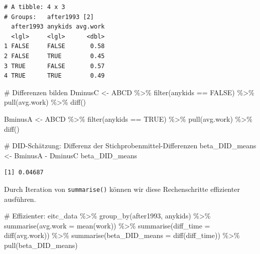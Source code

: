 \documentclass[
  a4paper,
  DIV=11,
  oneside]{scrreprt}
\newenvironment{Shaded}{\begin{snugshade}}{\end{snugshade}}
\newcommand{\AttributeTok}[1]{\textcolor[rgb]{0.40,0.45,0.13}{#1}}
\newcommand{\CommentTok}[1]{\textcolor[rgb]{0.37,0.37,0.37}{#1}}
\newcommand{\ConstantTok}[1]{\textcolor[rgb]{0.56,0.35,0.01}{#1}}
\newcommand{\FunctionTok}[1]{\textcolor[rgb]{0.28,0.35,0.67}{#1}}
\newcommand{\NormalTok}[1]{\textcolor[rgb]{0.00,0.23,0.31}{#1}}
\newcommand{\OtherTok}[1]{\textcolor[rgb]{0.00,0.23,0.31}{#1}}
\newcommand{\SpecialCharTok}[1]{\textcolor[rgb]{0.37,0.37,0.37}{#1}}
\begin{document}
\begin{verbatim}
# A tibble: 4 x 3
# Groups:   after1993 [2]
  after1993 anykids avg.work
  <lgl>     <lgl>      <dbl>
1 FALSE     FALSE       0.58
2 FALSE     TRUE        0.45
3 TRUE      FALSE       0.57
4 TRUE      TRUE        0.49
\end{verbatim}

\begin{Shaded}
\begin{Highlighting}[]
\CommentTok{\# Differenzen bilden}
\NormalTok{DminusC }\OtherTok{\textless{}{-}}\NormalTok{ ABCD }\SpecialCharTok{\%\textgreater{}\%}
    \FunctionTok{filter}\NormalTok{(anykids }\SpecialCharTok{==} \ConstantTok{FALSE}\NormalTok{) }\SpecialCharTok{\%\textgreater{}\%}
    \FunctionTok{pull}\NormalTok{(avg.work) }\SpecialCharTok{\%\textgreater{}\%}
    \FunctionTok{diff}\NormalTok{()}

\NormalTok{BminusA }\OtherTok{\textless{}{-}}\NormalTok{ ABCD }\SpecialCharTok{\%\textgreater{}\%}
    \FunctionTok{filter}\NormalTok{(anykids }\SpecialCharTok{==} \ConstantTok{TRUE}\NormalTok{) }\SpecialCharTok{\%\textgreater{}\%}
    \FunctionTok{pull}\NormalTok{(avg.work) }\SpecialCharTok{\%\textgreater{}\%}
    \FunctionTok{diff}\NormalTok{()}
\end{Highlighting}
\end{Shaded}

\begin{Shaded}
\begin{Highlighting}[]
\CommentTok{\# DID{-}Schätzung: Differenz der Stichprobenmittel{-}Differenzen}
\NormalTok{beta\_DID\_means }\OtherTok{\textless{}{-}}\NormalTok{ BminusA }\SpecialCharTok{{-}}\NormalTok{ DminusC}
\NormalTok{beta\_DID\_means}
\end{Highlighting}
\end{Shaded}

\begin{verbatim}
[1] 0.04687
\end{verbatim}

Durch Iteration von \texttt{summarise()} können wir diese Rechenschritte
effizienter ausführen.

\begin{Shaded}
\begin{Highlighting}[]
\CommentTok{\# Effizienter:}
\NormalTok{eitc\_data  }\SpecialCharTok{\%\textgreater{}\%} 
    \FunctionTok{group\_by}\NormalTok{(after1993, anykids) }\SpecialCharTok{\%\textgreater{}\%} 
    \FunctionTok{summarise}\NormalTok{(}\AttributeTok{avg.work =} \FunctionTok{mean}\NormalTok{(work)) }\SpecialCharTok{\%\textgreater{}\%}
    \FunctionTok{summarise}\NormalTok{(}\AttributeTok{diff\_time =} \FunctionTok{diff}\NormalTok{(avg.work)) }\SpecialCharTok{\%\textgreater{}\%}
    \FunctionTok{summarise}\NormalTok{(}\AttributeTok{beta\_DID\_means =} \FunctionTok{diff}\NormalTok{(diff\_time)) }\SpecialCharTok{\%\textgreater{}\%}
    \FunctionTok{pull}\NormalTok{(beta\_DID\_means)}
\end{Highlighting}
\end{Shaded}
\end{document}
